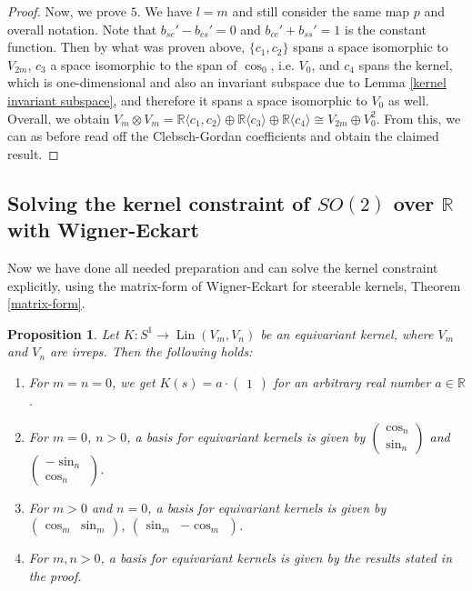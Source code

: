 \documentclass[12pt, a4paper]{article}
\theoremstyle{plain}
\newtheorem{pro}{Proposition}[section]
\theoremstyle{definition}
\theoremstyle{remark}
\newcommand{\R}{\mathds{R}}
\DeclareMathOperator{\lin}{Lin}
\begin{document}
\begin{proof}
Now, we prove $5$. We have $l = m$ and still consider the same map $p$ and overall notation. Note that $b_{sc}' - b_{cs}' = 0$ and $b_{cc}' + b_{ss}' = 1$ is the constant function. Then by what was proven above, $\{c_1, c_2\}$ spans a space isomorphic to $V_{2m}$, $c_3$ a space isomorphic to the span of $\cos_0$, i.e. $V_0$, and $c_4$ spans the kernel, which is one-dimensional and also an invariant subspace due to Lemma \ref{kernel invariant subspace}, and therefore it spans a space isomorphic to $V_0$ as well. Overall, we obtain $V_m \otimes V_m = \R\langle c_1, c_2\rangle \oplus \R\langle c_3\rangle  \oplus \R\langle c_4\rangle \cong V_{2m} \oplus V_0^2$. From this, we can as before read off the Clebsch-Gordan coefficients and obtain the claimed result.
\end{proof}



\subsection{Solving the kernel constraint of $SO(2)$ over $\R$ with Wigner-Eckart}

Now we have done all needed preparation and can solve the kernel constraint explicitly, using the matrix-form of Wigner-Eckart for steerable kernels, Theorem \ref{matrix-form}.

\begin{pro}
Let $K: S^1 \to \lin(V_m, V_n)$ be an equivariant kernel, where $V_m$ and $V_n$ are irreps. Then the following holds:

\begin{enumerate}
\item For $m = n = 0$, we get $K(s) = a \cdot \begin{pmatrix} 1 \end{pmatrix}$ for an arbitrary real number $a \in \R$.
\item For $m = 0$, $n > 0$, a basis for equivariant kernels is given by $\begin{pmatrix} \cos_n \\ \sin_n \end{pmatrix}$ and $\begin{pmatrix}- \sin_n \\ \cos_n \end{pmatrix}$.
\item For $m > 0$ and $n = 0$, a basis for equivariant kernels is given by $\begin{pmatrix} \cos_m & \sin_m \end{pmatrix}$, $\begin{pmatrix}  \sin_m & - \cos_m \end{pmatrix}$.
\item For $m, n > 0$, a basis for equivariant kernels is given by the results stated in the proof.
\end{enumerate}
\end{pro}
\end{document}
